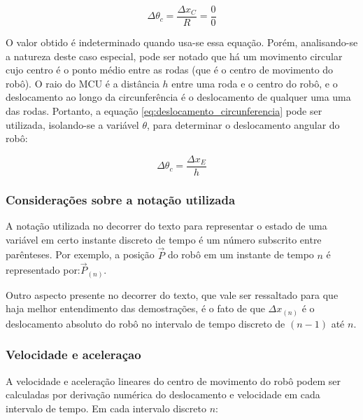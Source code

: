 \begin{equation}
  \Delta \theta_c = \frac{\Delta x_C}{R} = \frac{0}{0}
  \label{eq:caso_especial2_theta}
\end{equation}

O valor obtido é indeterminado quando usa-se essa equação. Porém, analisando-se a natureza deste caso especial, pode ser notado que há um movimento circular cujo centro é o ponto médio entre as rodas (que é o centro de movimento do robô). O raio do MCU é a distância $h$ entre uma roda e o centro do robô, e o deslocamento ao longo da circunferência é o deslocamento de qualquer uma uma das rodas. Portanto, a equação \ref{eq:deslocamento_circunferencia} pode ser utilizada, isolando-se a variável $\theta$, para determinar o deslocamento angular do robô:

\begin{equation}
  \Delta \theta_c = \frac{\Delta x_E}{h}
  \label{eq:caso_especial2_theta2}
\end{equation}

\subsubsection{Considerações sobre a notação utilizada}

A notação utilizada no decorrer do texto para representar o estado de uma variável em certo instante discreto de tempo é um número subscrito entre parênteses. Por exemplo, a posição $\overrightarrow{P}$ do robô em um instante de tempo $n$ é representado por:$\overrightarrow{P}_{(n)}$. 

Outro aspecto presente no decorrer do texto, que vale ser ressaltado para que haja melhor entendimento das demostrações, é o fato de que $\Delta x_{(n)}$ é o deslocamento absoluto do robô no intervalo de tempo discreto de $(n-1)$ até $n$.

%

\subsubsection{Velocidade e aceleraçao}

A velocidade e aceleração lineares do centro de movimento do robô podem ser calculadas por derivação numérica do deslocamento e velocidade em cada intervalo de tempo. Em cada intervalo discreto $n$:

